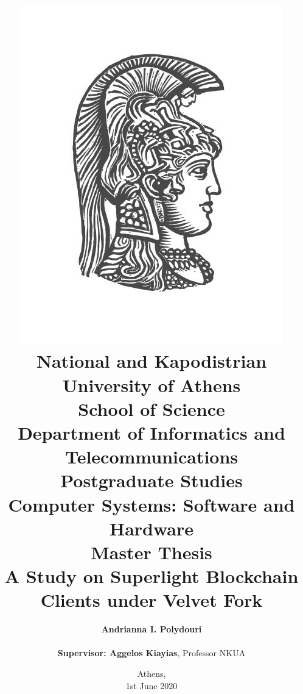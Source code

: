 \title{
    {\includegraphics[scale=0.8]{figures/logo_uoa.jpg}}\\
    {\large National and Kapodistrian University of Athens \\ 
    School of Science \\ 
    Department of Informatics and Telecommunications}\\
    \vspace{1cm}
    Postgraduate Studies \\ 
    Computer Systems: Software and Hardware\\
    \vspace{10mm}
    {Master Thesis}\\
    \vspace{3mm}
    {\textbf{\LARGE A Study on Superlight Blockchain Clients under Velvet Fork}}\\
    \vspace{1cm}
    }

\author{
    \textbf{Andrianna I. Polydouri} \\ 
    \vspace{1cm} \\ 
    \textbf{Supervisor: Aggelos Kiayias}, Professor NKUA
    \vspace{2cm}
}

\date{Athens, \\ 1st June 2020}